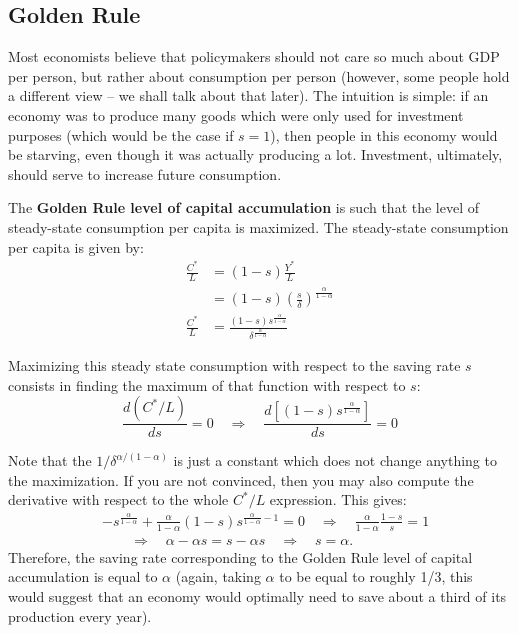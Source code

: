 \documentclass[]{book}
\theoremstyle{definition}
\theoremstyle{definition}
\theoremstyle{definition}
\theoremstyle{remark}
\begin{document}
\subsection{Golden Rule}\label{golden-rule}

Most economists believe that policymakers should not care so much about
GDP per person, but rather about consumption per person (however, some
people hold a different view -- we shall talk about that later). The
intuition is simple: if an economy was to produce many goods which were
only used for investment purposes (which would be the case if
\(s = 1\)), then people in this economy would be starving, even though
it was actually producing a lot. Investment, ultimately, should serve to
increase future consumption.

The \textbf{Golden Rule level of capital accumulation} is such that the
level of steady-state consumption per capita is maximized. The
steady-state consumption per capita is given by: \[
\begin{aligned}
\frac{C^{*}}{L}&=(1-s)\frac{Y^{*}}{L}\\
&=(1-s)\left(\frac{s}{\delta}\right)^{\frac{\alpha}{1-\alpha}}\\
\frac{C^{*}}{L}&=\frac{(1-s)s^{\frac{\alpha}{1-\alpha}}}{\delta^{\frac{\alpha}{1-\alpha}}}
\end{aligned}
\]

Maximizing this steady state consumption with respect to the saving rate
\(s\) consists in finding the maximum of that function with respect to
\(s\):
\[\frac{d\left(C^{*}/L\right)}{ds}=0\quad\Rightarrow\quad\frac{d\left[(1-s)s^{\frac{\alpha}{1-\alpha}}\right]}{ds}=0\]

Note that the \(1/\delta^{\alpha/(1-\alpha)}\) is just a constant which
does not change anything to the maximization. If you are not convinced,
then you may also compute the derivative with respect to the whole
\(C^{*}/L\) expression. This gives: \[
\begin{aligned}
&-s^{\frac{\alpha}{1-\alpha}}+\frac{\alpha}{1-\alpha}(1-s)s^{\frac{\alpha}{1-\alpha}-1} =0 \quad \Rightarrow\quad\frac{\alpha}{1-\alpha}\frac{1-s}{s}=1\\
&\quad \quad \Rightarrow\quad\alpha-\alpha s=s-\alpha s \quad\Rightarrow\quad\boxed{s=\alpha}.
\end{aligned}
\] Therefore, the saving rate corresponding to the Golden Rule level of
capital accumulation is equal to \(\alpha\) (again, taking \(\alpha\) to
be equal to roughly 1/3, this would suggest that an economy would
optimally need to save about a third of its production every year).
\end{document}
